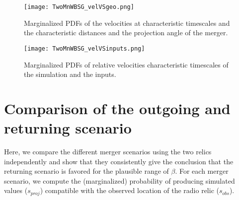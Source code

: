 \begin{figure*}
\begin{minipage}{180mm}
	\begin{center}
	\texttt{[image: TwoMnWBSG\_velVSgeo.png]}
	\caption{Marginalized PDFs of the velocities at characteristic timescales
		and the characteristic distances and the projection angle of the merger. }
	\end{center}
\end{minipage}
\end{figure*}
\begin{figure*}
\begin{minipage}{180mm}
	\begin{center}
	\texttt{[image: TwoMnWBSG\_velVSinputs.png]}
	\caption{Marginalized PDFs of relative velocities characteristic
	timescales of the simulation and the inputs.}
	\end{center}
\end{minipage}
\end{figure*}

\section{Comparison of the outgoing and returning scenario}
\label{app:Bayes_factor}
Here, we compare the different merger scenarios using the two relics
independently and show that they consistently give the conclusion that the returning
scenario is favored for the plausible range of $\beta$. For each merger
scenario, we compute
the (marginalized) probability of producing simulated
values ($s_{proj}$) compatible with the observed location of the radio
relic ($s_{obs}$). 

